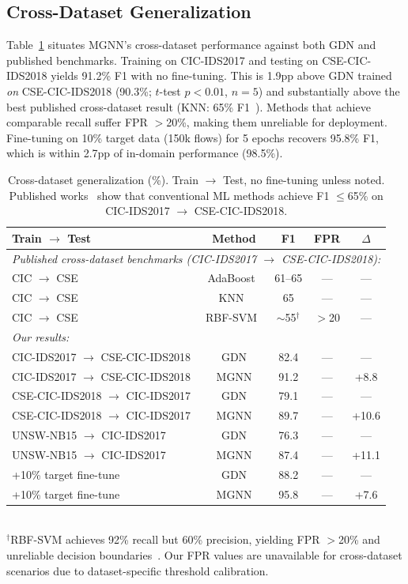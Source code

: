 \documentclass[conference]{IEEEtran}
\begin{document}
\subsection{Cross-Dataset Generalization}
Table~\ref{tab:xds} situates MGNN's cross-dataset performance against both GDN and published benchmarks. Training on CIC-IDS2017 and testing on CSE-CIC-IDS2018 yields 91.2\% F1 with no fine-tuning. This is 1.9pp above GDN trained \textit{on} CSE-CIC-IDS2018 (90.3\%; $t$-test $p<0.01$, $n=5$) and substantially above the best published cross-dataset result (KNN: 65\% F1~\cite{sarhan2023cross}). Methods that achieve comparable recall suffer FPR $>$20\%, making them unreliable for deployment. Fine-tuning on 10\% target data (150k flows) for 5 epochs recovers 95.8\% F1, which is within 2.7pp of in-domain performance (98.5\%).

\begin{table}[t]
\caption{Cross-dataset generalization (\%). Train $\to$ Test, no fine-tuning unless noted. Published works~\cite{sarhan2023cross} show that conventional ML methods achieve F1 $\le$65\% on CIC-IDS2017 $\to$ CSE-CIC-IDS2018.}
\label{tab:xds}
\centering
\scriptsize

\begin{tabular}{lcccc}
\toprule
Train $\to$ Test & Method & F1 & FPR & $\Delta$ \\
\midrule
\multicolumn{5}{l}{\textit{Published cross-dataset benchmarks (CIC-IDS2017 $\to$ CSE-CIC-IDS2018):}} \\
CIC $\to$ CSE & AdaBoost~\cite{sarhan2023cross} & 61--65 & --- & --- \\
CIC $\to$ CSE & KNN~\cite{sarhan2023cross} & 65 & --- & --- \\
CIC $\to$ CSE & RBF-SVM~\cite{sarhan2023cross} & $\sim$55$^\dagger$ & $>$20 & --- \\
\midrule
\multicolumn{5}{l}{\textit{Our results:}} \\
CIC-IDS2017 $\to$ CSE-CIC-IDS2018 & GDN & 82.4 & --- & --- \\
CIC-IDS2017 $\to$ CSE-CIC-IDS2018 & MGNN & 91.2 & --- & +8.8 \\
CSE-CIC-IDS2018 $\to$ CIC-IDS2017 & GDN & 79.1 & --- & --- \\
CSE-CIC-IDS2018 $\to$ CIC-IDS2017 & MGNN & 89.7 & --- & +10.6 \\
UNSW-NB15 $\to$ CIC-IDS2017 & GDN & 76.3 & --- & --- \\
UNSW-NB15 $\to$ CIC-IDS2017 & MGNN & 87.4 & --- & +11.1 \\
\;\;+10\% target fine-tune & GDN & 88.2 & --- & --- \\
\;\;+10\% target fine-tune & MGNN & 95.8 & --- & +7.6 \\
\bottomrule
\end{tabular}
\vspace{3pt}\\
{\footnotesize $^\dagger$RBF-SVM achieves 92\% recall but 60\% precision, yielding FPR $>$20\% and unreliable decision boundaries~\cite{sarhan2023cross}. Our FPR values are unavailable for cross-dataset scenarios due to dataset-specific threshold calibration.}
\end{table}
\end{document}
